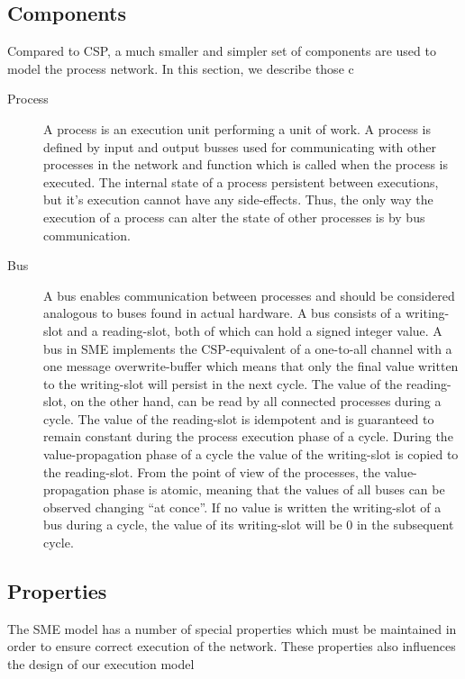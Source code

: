 \subsection{Components}
Compared to CSP, a much smaller and simpler set of components are used
to model the process network. In this section, we describe those
c

\begin{description}
\item[Process] A process is an execution unit performing a unit of
  work. A process is defined by input and output busses used for
  communicating with other processes in the network and function which
  is called when the process is executed. The internal state of a
  process persistent between executions, but it's execution cannot
  have any side-effects. Thus, the only way the execution of a process
  can alter the state of other processes is by bus communication.
\item[Bus] A bus enables communication between processes and should be
  considered analogous to buses found in actual hardware. A bus
  consists of a writing-slot and a reading-slot, both of which can
  hold a signed integer value. A bus in SME implements the
  CSP-equivalent of a one-to-all channel with a one message
  overwrite-buffer which means that only the final value written to
  the writing-slot will persist in the next cycle. The value of the
  reading-slot, on the other hand, can be read by all connected
  processes during a cycle. The value of the reading-slot is
  idempotent and is guaranteed to remain constant during the process
  execution phase of a cycle. During the value-propagation phase of a
  cycle the value of the writing-slot is copied to the
  reading-slot. From the point of view of the processes, the
  value-propagation phase is atomic, meaning that the values of all
  buses can be observed changing ``at conce''. If no value is written
  the writing-slot of a bus during a cycle, the value of its
  writing-slot will be 0 in the subsequent cycle.

\end{description}

\subsection{Properties}
The SME model has a number of special properties which must be
maintained in order to ensure correct execution of the network. These
properties also influences the design of our execution model

